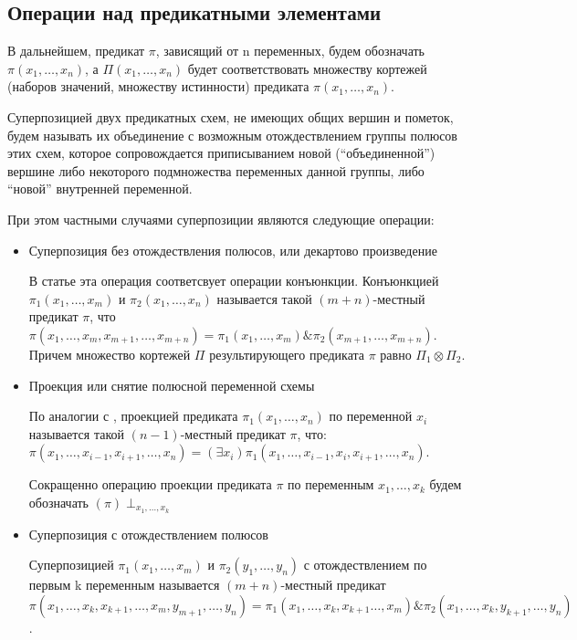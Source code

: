 \documentclass[12pt]{article}
\newenvironment{definition}[1][Определение]{\begin{trivlist}
\item[\hskip \labelsep {\bfseries #1}]}{\end{trivlist}}
\begin{document}
\subsection{Операции над предикатными элементами}
В дальнейшем, предикат $\pi$, зависящий от n переменных, будем обозначать $\pi(x_1, \dots, x_n)$, а 
$\Pi(x_1, \dots, x_n)$ будет соответствовать множеству кортежей (наборов значений, множеству истинности) 
предиката $\pi(x_1, \dots, x_n)$.  

\begin{definition}
Суперпозицией двух предикатных схем, не имеющих общих вершин и пометок, 
будем называть их объединение с возможным отождествлением группы полюсов этих схем, 
которое сопровождается приписыванием новой (``объединенной'') вершине либо 
некоторого подмножества переменных данной группы, либо ``новой'' внутренней переменной.

При этом частными случаями суперпозиции являются следующие операции:

\begin{itemize}
    \item Суперпозиция без отождествления полюсов, или декартово произведение

    В статье \cite{Marchenkov} эта операция соответсвует операции конъюнкции.
    Конъюнкцией $\pi_1(x_1, \dots, x_m)$ и $\pi_2(x_1, \dots, x_n)$ называется такой $(m+n)$-местный предикат $\pi$, что
    $\pi(x_1, \dots, x_m, x_{m+1}, \dots, x_{m+n}) = \pi_1(x_1, \dots, x_m) \& \pi_2(x_{m+1}, \dots, x_{m+n})$.
    Причем множество кортежей $\Pi$ результирующего предиката $\pi$ равно $\Pi_1 \otimes \Pi_2$.

    \item Проекция или снятие полюсной переменной схемы

    По аналогии с \cite{Marchenkov}, проекцией предиката $\pi_1(x_1, \dots, x_n)$ по переменной $x_i$ называется такой
    $(n-1)$-местный предикат $\pi$, что:
    $\pi(x_1, \dots, x_{i-1}, x_{i+1}, \dots, x_n) = (\exists x_i) \pi_1(x_1, \dots, x_{i-1}, x_i, x_{i+1}, \dots, x_n)$.

    Сокращенно операцию проекции предиката $\pi$ по переменным $x_1, \dots, x_k$ будем обозначать $(\pi)\perp_{x_1, \dots, x_k}$

    \item Суперпозиция с отождествлением полюсов

    Суперпозицией $\pi_1(x_1, \dots, x_m)$ и $\pi_2(y_1, \dots, y_n)$ с отождествлением по первым k переменным 
    называется $(m+n)$-местный предикат
    $\pi(x_1, \dots, x_k, x_{k+1}, \dots, x_m, y_{m+1}, \dots, y_n) = \pi_1(x_1, \dots, x_k, x_{k+1} \dots, x_m) \& \pi_2(x_1, \dots, x_k, y_{k+1}, \dots, y_n)$.


\end{itemize}
\end{definition}
\end{document}

